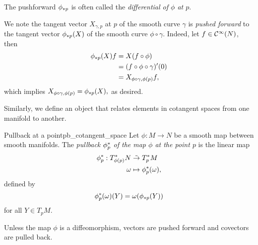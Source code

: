 \begin{remark}
    The pushforward \(\pf[p]{\phi}\) is often called the \emph{differential of \(\phi\) at \(p\)}.
\end{remark}

We note the tangent vector \(X_{\gamma,p}\) at \(p\) of the smooth curve \(\gamma\) is \emph{pushed forward} to the tangent vector \(\pf[p]{\phi}(X)\) of the smooth curve \(\phi \circ \gamma.\) Indeed, let \(f \in \smooth{N}\), then
\begin{align*}
    \pf[p]\phi(X)f &= X(f \circ \phi)\\
                   &= (f \circ \phi \circ \gamma)'(0)\\
                   &= X_{\phi \circ \gamma, \phi(p)} f,
\end{align*}
which implies \(X_{\phi \circ \gamma, \phi(p)} = \pf[p]\phi(X),\) as desired.

Similarly, we define an object that relates elements in cotangent spaces from one manifold to another.

\begin{definition}{Pullback at a point}{pb_cotangent_space}
    Let \(\phi : M \to N\) be a smooth map between smooth manifolds. The \emph{pullback \(\pb[p]\phi\) of the map \(\phi\) at the point \(p\)} is the linear map
    \begin{align*}
        \pb[p]\phi : T_{\phi(p)}^{\ast}N &\linear T_{p}^{\ast}M\\
        \omega &\mapsto \pb[p]\phi(\omega),
    \end{align*}
    defined by
    \begin{equation*}
        \pb[p]\phi(\omega)(Y) = \omega(\pf[p]\phi(Y))
    \end{equation*}
    for all \(Y \in T_pM\).
\end{definition}
\begin{remark}
    Unless the map \(\phi\) is a diffeomorphism, vectors are pushed forward and covectors are pulled back.
\end{remark}


